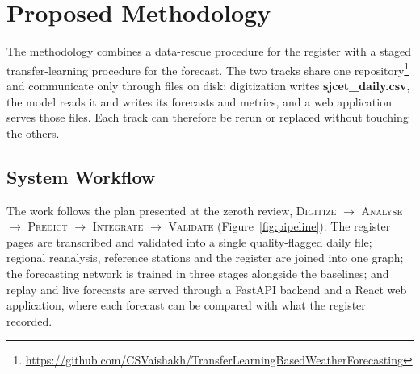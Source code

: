 \setcounter{equation}{0}
\chapter{Proposed Methodology}
\label{chap:methodology}

The methodology combines a data-rescue procedure for the register with a staged transfer-learning procedure for the forecast. The two tracks share one repository\footnote{\url{https://github.com/CSVaishakh/TransferLearningBasedWeatherForecasting}} and communicate only through files on disk: digitization writes \textbf{sjcet\_daily.csv}, the model reads it and writes its forecasts and metrics, and a web application serves those files. Each track can therefore be rerun or replaced without touching the others.

\section{System Workflow}
\label{sec:workflow}

The work follows the plan presented at the zeroth review, \textsc{Digitize $\to$\allowbreak{} Analyse $\to$\allowbreak{} Predict $\to$\allowbreak{} Integrate $\to$\allowbreak{} Validate} (Figure~\ref{fig:pipeline}). The register pages are transcribed and validated into a single quality-flagged daily file; regional reanalysis, reference stations and the register are joined into one graph; the forecasting network is trained in three stages alongside the baselines; and replay and live forecasts are served through a FastAPI backend and a React web application, where each forecast can be compared with what the register recorded.

